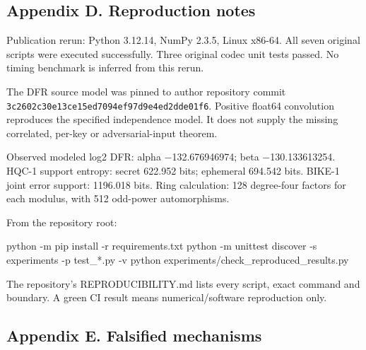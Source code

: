 \documentclass[
  10pt,
  a4paper,
]{article}
\newenvironment{Shaded}{}{}
\newcommand{\AttributeTok}[1]{\textcolor[rgb]{0.49,0.56,0.16}{#1}}
\newcommand{\ExtensionTok}[1]{#1}
\newcommand{\NormalTok}[1]{#1}
\newcommand{\StringTok}[1]{\textcolor[rgb]{0.25,0.44,0.63}{#1}}
\begin{document}
\hypertarget{appendix-d.-reproduction-notes}{%
\subsection{Appendix D. Reproduction
notes}\label{appendix-d.-reproduction-notes}}

Publication rerun: Python 3.12.14, NumPy 2.3.5, Linux x86-64. All seven
original scripts were executed successfully. Three original codec unit
tests passed. No timing benchmark is inferred from this rerun.

The DFR source model was pinned to author repository commit
\texttt{3c2602c30e13ce15ed7094ef97d9e4ed2dde01f6}. Positive float64
convolution reproduces the specified independence model. It does not
supply the missing correlated, per-key or adversarial-input theorem.

Observed modeled log2 DFR: alpha −132.676946974; beta −130.133613254.
HQC-1 support entropy: secret 622.952 bits; ephemeral 694.542 bits.
BIKE-1 joint error support: 1196.018 bits. Ring calculation: 128
degree-four factors for each modulus, with 512 odd-power automorphisms.

From the repository root:

\begin{Shaded}
\begin{Highlighting}[]
\ExtensionTok{python} \AttributeTok{{-}m}\NormalTok{ pip install }\AttributeTok{{-}r}\NormalTok{ requirements.txt}
\ExtensionTok{python} \AttributeTok{{-}m}\NormalTok{ unittest discover }\AttributeTok{{-}s}\NormalTok{ experiments }\AttributeTok{{-}p} \StringTok{\textquotesingle{}test\_*.py\textquotesingle{}} \AttributeTok{{-}v}
\ExtensionTok{python}\NormalTok{ experiments/check\_reproduced\_results.py}
\end{Highlighting}
\end{Shaded}

The repository's REPRODUCIBILITY.md lists every script, exact command
and boundary. A green CI result means numerical/software reproduction
only.

\hypertarget{appendix-e.-falsified-mechanisms}{%
\subsection{Appendix E. Falsified
mechanisms}\label{appendix-e.-falsified-mechanisms}}
\end{document}
